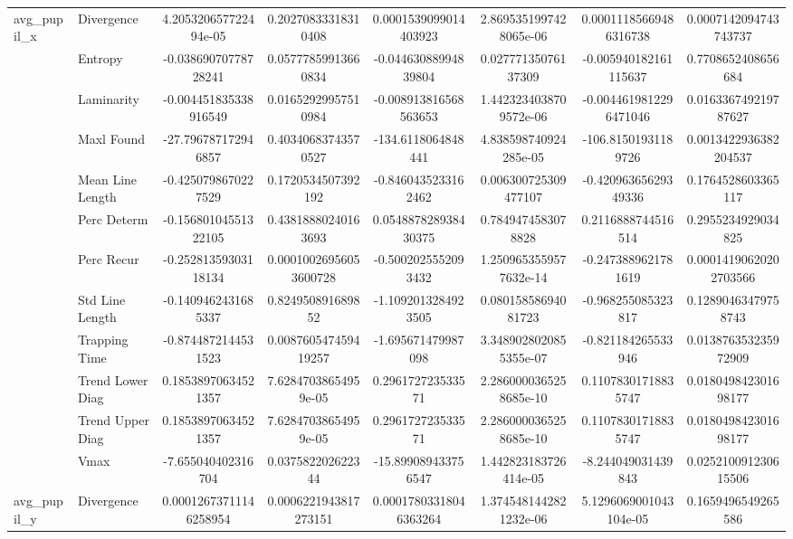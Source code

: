 \begin{tabular}{llcc|cc|cc}
\midrule
\multirow{12}{*}{avg_pupil_x} & Divergence & 4.205320657722494e-05 & 0.20270833318310408 & 0.0001539099014403923 & 2.8695351997428065e-06 & 0.00011185669486316738 & 0.0007142094743743737 \\
 & Entropy & -0.03869070778728241 & 0.05777859913660834 & -0.04463088994839804 & 0.02777135076137309 & -0.005940182161115637 & 0.7708652408656684 \\
 & Laminarity & -0.004451835338916549 & 0.01652929957510984 & -0.008913816568563653 & 1.4423234038709572e-06 & -0.0044619812296471046 & 0.016336749219787627 \\
 & Maxl Found & -27.796787172946857 & 0.40340683743570527 & -134.6118064848441 & 4.838598740924285e-05 & -106.81501931189726 & 0.0013422936382204537 \\
 & Mean Line Length & -0.4250798670227529 & 0.1720534507392192 & -0.8460435233162462 & 0.006300725309477107 & -0.42096365629349336 & 0.1764528603365117 \\
 & Perc Determ & -0.15680104551322105 & 0.43818880240163693 & 0.054887828938430375 & 0.7849474583078828 & 0.2116888744516514 & 0.2955234929034825 \\
 & Perc Recur & -0.25281359303118134 & 0.00010026956053600728 & -0.5002025552093432 & 1.2509653559577632e-14 & -0.2473889621781619 & 0.00014190620202703566 \\
 & Std Line Length & -0.1409462431685337 & 0.824950891689852 & -1.1092013284923505 & 0.08015858694081723 & -0.968255085323817 & 0.12890463479758743 \\
 & Trapping Time & -0.8744872144531523 & 0.008760547459419257 & -1.695671479987098 & 3.3489028020855355e-07 & -0.821184265533946 & 0.013876353235972909 \\
 & Trend Lower Diag & 0.18538970634521357 & 7.62847038654959e-05 & 0.296172723533571 & 2.2860000365258685e-10 & 0.11078301718835747 & 0.018049842301698177 \\
 & Trend Upper Diag & 0.18538970634521357 & 7.62847038654959e-05 & 0.296172723533571 & 2.2860000365258685e-10 & 0.11078301718835747 & 0.018049842301698177 \\
 & Vmax & -7.655040402316704 & 0.037582202622344 & -15.899089433756547 & 1.442823183726414e-05 & -8.244049031439843 & 0.025210091230615506 \\
\midrule
\multirow{12}{*}{avg_pupil_y} & Divergence & 0.00012673711146258954 & 0.0006221943817273151 & 0.00017803318046363264 & 1.3745481442821232e-06 & 5.1296069001043104e-05 & 0.1659496549265586 \\

\end{tabular}

